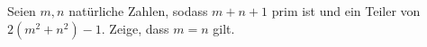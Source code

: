 Seien $m,n$ natürliche Zahlen, sodass $m+n+1$ prim ist und ein Teiler von $2(m^2+n^2)-1$.
Zeige, dass $m=n$ gilt.
